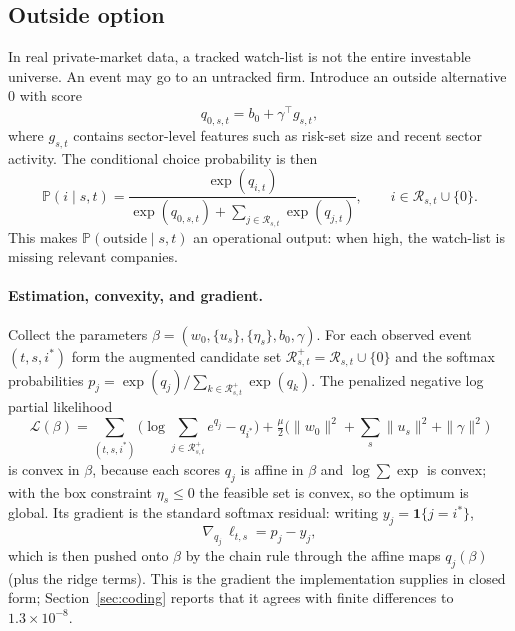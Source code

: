 \documentclass[11pt]{article}
\theoremstyle{plain}
\theoremstyle{definition}
\theoremstyle{remark}
\newcommand{\Prob}{\mathbb{P}}
\newcommand{\cR}{\mathcal{R}}
\newcommand{\cL}{\mathcal{L}}
\newcommand{\one}{\mathbf{1}}
\begin{document}
\subsection{Outside option}
In real private-market data, a tracked watch-list is not the entire investable universe. An event may go to an untracked firm. Introduce an outside alternative $0$ with score
\begin{equation}
q_{0,s,t}=b_0+\gamma^\top g_{s,t},
\label{eq:outside_score}
\end{equation}
where $g_{s,t}$ contains sector-level features such as risk-set size and recent sector activity. The conditional choice probability is then
\begin{equation}
\Prob(i\mid s,t)=
\frac{\exp(q_{i,t})}{\exp(q_{0,s,t})+\sum_{j\in\cR_{s,t}}\exp(q_{j,t})},
\qquad i\in\cR_{s,t}\cup\{0\}.
\label{eq:outside_choice}
\end{equation}
This makes $\Prob(\text{outside}\mid s,t)$ an operational output: when high, the watch-list is missing relevant companies.

\paragraph{Estimation, convexity, and gradient.}
Collect the parameters $\beta=(w_0,\{u_s\},\{\eta_s\},b_0,\gamma)$. For each observed event $(t,s,i^\ast)$ form the augmented candidate set $\cR^+_{s,t}=\cR_{s,t}\cup\{0\}$ and the softmax probabilities $p_j=\exp(q_j)/\sum_{k\in\cR^+_{s,t}}\exp(q_k)$. The penalized negative log partial likelihood
\begin{equation}
\cL(\beta)=\sum_{(t,s,i^\ast)}\Big(\log\!\!\sum_{j\in\cR^+_{s,t}}\!\!e^{q_j}-q_{i^\ast}\Big)
+\tfrac{\mu}{2}\big(\|w_0\|^2+\textstyle\sum_s\|u_s\|^2+\|\gamma\|^2\big)
\label{eq:survival_obj}
\end{equation}
is convex in $\beta$, because each scores $q_j$ is affine in $\beta$ and $\log\sum\exp$ is convex; with the box constraint $\eta_s\le0$ the feasible set is convex, so the optimum is global. Its gradient is the standard softmax residual: writing $y_j=\one\{j=i^\ast\}$,
\begin{equation}
\nabla_{q_j}\,\ell_{t,s}=p_j-y_j,
\label{eq:survival_grad}
\end{equation}
which is then pushed onto $\beta$ by the chain rule through the affine maps $q_j(\beta)$ (plus the ridge terms). This is the gradient the implementation supplies in closed form; Section~\ref{sec:coding} reports that it agrees with finite differences to $1.3\times10^{-8}$.
\end{document}
